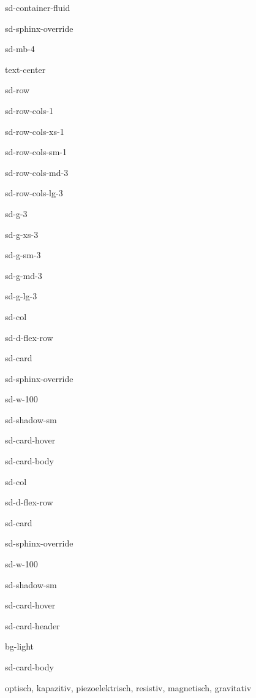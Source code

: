 \documentclass[letterpaper,10pt,english]{jupyterBook}
\let\sphinxpxdimen\pdfpxdimen\else\newdimen\sphinxpxdimen
\begin{document}
\begin{sphinxuseclass}{sd-container-fluid}
\begin{sphinxuseclass}{sd-sphinx-override}
\begin{sphinxuseclass}{sd-mb-4}
\begin{sphinxuseclass}{text-center}
\begin{sphinxuseclass}{sd-row}
\begin{sphinxuseclass}{sd-row-cols-1}
\begin{sphinxuseclass}{sd-row-cols-xs-1}
\begin{sphinxuseclass}{sd-row-cols-sm-1}
\begin{sphinxuseclass}{sd-row-cols-md-3}
\begin{sphinxuseclass}{sd-row-cols-lg-3}
\begin{sphinxuseclass}{sd-g-3}
\begin{sphinxuseclass}{sd-g-xs-3}
\begin{sphinxuseclass}{sd-g-sm-3}
\begin{sphinxuseclass}{sd-g-md-3}
\begin{sphinxuseclass}{sd-g-lg-3}
\begin{sphinxuseclass}{sd-col}
\begin{sphinxuseclass}{sd-d-flex-row}
\begin{sphinxuseclass}{sd-card}
\begin{sphinxuseclass}{sd-sphinx-override}
\begin{sphinxuseclass}{sd-w-100}
\begin{sphinxuseclass}{sd-shadow-sm}
\begin{sphinxuseclass}{sd-card-hover}
\begin{sphinxuseclass}{sd-card-body}
\end{sphinxuseclass}{\hyperref[\detokenize{content/4_ElektrischeGroessen::doc}]{}}
\end{sphinxuseclass}
\end{sphinxuseclass}
\end{sphinxuseclass}
\end{sphinxuseclass}
\end{sphinxuseclass}
\end{sphinxuseclass}
\end{sphinxuseclass}
\begin{sphinxuseclass}{sd-col}
\begin{sphinxuseclass}{sd-d-flex-row}
\begin{sphinxuseclass}{sd-card}
\begin{sphinxuseclass}{sd-sphinx-override}
\begin{sphinxuseclass}{sd-w-100}
\begin{sphinxuseclass}{sd-shadow-sm}
\begin{sphinxuseclass}{sd-card-hover}
\begin{sphinxuseclass}{sd-card-header}
\begin{sphinxuseclass}{bg-light}
\sphinxAtStartPar
{}

\end{sphinxuseclass}
\end{sphinxuseclass}
\begin{sphinxuseclass}{sd-card-body}
\noindent\sphinxincludegraphics[height=120\sphinxpxdimen]{{bandpass}.png}

\sphinxAtStartPar
optisch, kapazitiv, piezo\sphinxhyphen{}elektrisch, resistiv, magnetisch, gravitativ


\end{sphinxuseclass}
\end{sphinxuseclass}
\end{sphinxuseclass}
\end{sphinxuseclass}
\end{sphinxuseclass}
\end{sphinxuseclass}
\end{sphinxuseclass}
\end{sphinxuseclass}
\end{sphinxuseclass}
\end{sphinxuseclass}
\end{sphinxuseclass}
\end{sphinxuseclass}
\end{sphinxuseclass}
\end{sphinxuseclass}
\end{sphinxuseclass}
\end{sphinxuseclass}
\end{sphinxuseclass}
\end{sphinxuseclass}
\end{sphinxuseclass}
\end{sphinxuseclass}
\end{sphinxuseclass}
\end{sphinxuseclass}
\end{sphinxuseclass}
\end{document}
